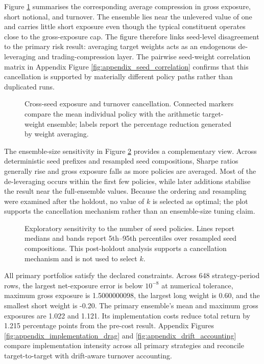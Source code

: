 Figure \ref{fig:ensemble_cancellation} summarises the corresponding average compression in gross exposure, short notional, and turnover. The ensemble lies near the unlevered value of one and carries little short exposure even though the typical constituent operates close to the gross-exposure cap. The figure therefore links seed-level disagreement to the primary risk result: averaging target weights acts as an endogenous de-leveraging and trading-compression layer. The pairwise seed-weight correlation matrix in Appendix Figure \ref{fig:appendix_seed_correlation} confirms that this cancellation is supported by materially different policy paths rather than duplicated runs.

\begin{figure}[!tbp]
\centering

\caption{Cross-seed exposure and turnover cancellation. Connected markers
compare the mean individual policy with the arithmetic target-weight ensemble;
labels report the percentage reduction generated by weight averaging.}
\label{fig:ensemble_cancellation}
\end{figure}

The ensemble-size sensitivity in Figure \ref{fig:ensemble_size_sensitivity} provides a complementary view. Across deterministic seed prefixes and resampled seed compositions, Sharpe ratios generally rise and gross exposure falls as more policies are averaged. Most of the de-leveraging occurs within the first few policies, while later additions stabilise the result near the full-ensemble values. Because the ordering and resampling were examined after the holdout, no value of $k$ is selected as optimal; the plot supports the cancellation mechanism rather than an ensemble-size tuning claim.

\begin{figure}[htbp]
\centering

\caption{Exploratory sensitivity to the number of seed policies. Lines report medians and bands report 5th--95th percentiles over resampled seed compositions. This post-holdout analysis supports a cancellation mechanism and is not used to select $k$.}
\label{fig:ensemble_size_sensitivity}
\end{figure}

All primary portfolios satisfy the declared constraints. Across 648 strategy-period rows, the largest net-exposure error is below $10^{-8}$ at numerical tolerance, maximum gross exposure is 1.5000000098, the largest long weight is 0.60, and the smallest short weight is -0.20. The primary ensemble's mean and maximum gross exposures are 1.022 and 1.121. Its implementation costs reduce total return by 1.215 percentage points from the pre-cost result. Appendix Figures \ref{fig:appendix_implementation_drag} and \ref{fig:appendix_drift_accounting} compare implementation intensity across all primary strategies and reconcile target-to-target with drift-aware turnover accounting.

